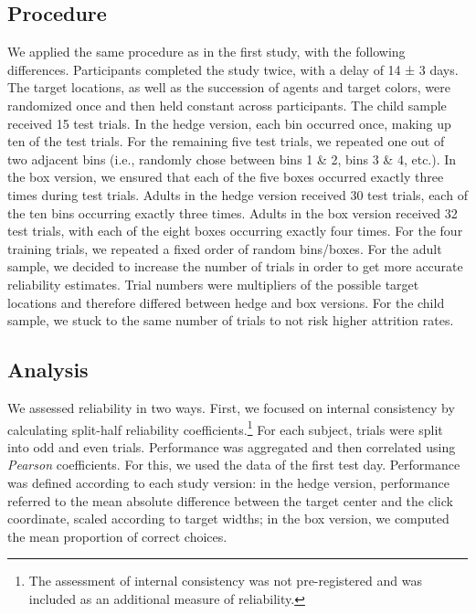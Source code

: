 \documentclass[
  man,floatsintext]{apa7}
\begin{document}
\hypertarget{procedure-1}{%
\subsection{Procedure}\label{procedure-1}}

We applied the same procedure as in the first study, with the following differences.
Participants completed the study twice, with a delay of 14 ± 3 days.
The target locations, as well as the succession of agents and target colors, were randomized once and then held constant across participants.
The child sample received 15 test trials.
In the hedge version, each bin occurred once, making up ten of the test trials.
For the remaining five test trials, we repeated one out of two adjacent bins (i.e., randomly chose between bins 1 \& 2, bins 3 \& 4, etc.).
In the box version, we ensured that each of the five boxes occurred exactly three times during test trials.
Adults in the hedge version received 30 test trials, each of the ten bins occurring exactly three times.
Adults in the box version received 32 test trials, with each of the eight boxes occurring exactly four times.
For the four training trials, we repeated a fixed order of random bins/boxes.
For the adult sample, we decided to increase the number of trials in order to get more accurate reliability estimates.
Trial numbers were multipliers of the possible target locations and therefore differed between hedge and box versions.
For the child sample, we stuck to the same number of trials to not risk higher attrition rates.

\hypertarget{analysis-1}{%
\subsection{Analysis}\label{analysis-1}}

We assessed reliability in two ways.
First, we focused on internal consistency by calculating split-half reliability coefficients.\footnote{The assessment of internal consistency was not pre-registered and was included as an additional measure of reliability.}
For each subject, trials were split into odd and even trials.
Performance was aggregated and then correlated using \emph{Pearson} coefficients.
For this, we used the data of the first test day.
Performance was defined according to each study version: in the hedge version, performance referred to the mean absolute difference between the target center and the click coordinate, scaled according to target widths; in the box version, we computed the mean proportion of correct choices.
\end{document}
